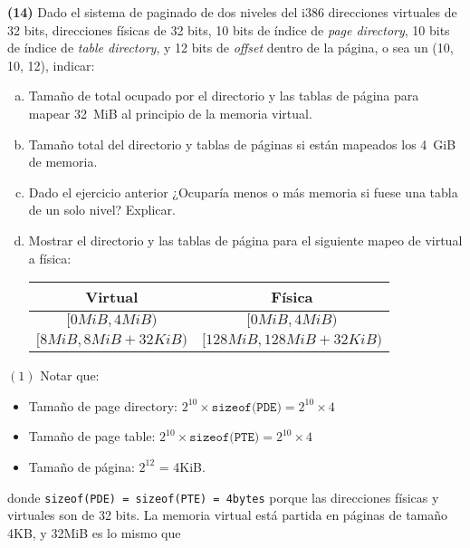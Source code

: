 \documentclass[12pt]{article}
\theoremstyle{definition}
\begin{document}
\begin{shaded}
\textbf{(14)} Dado el sistema de paginado de dos niveles del i386 direcciones
virtuales de 32 bits, direcciones físicas de 32 bits, 10 bits de índice de
\textit{page directory}, 10 bits de índice de \textit{table directory}, y 12
bits de \textit{offset} dentro de la página, o sea un (10, 10, 12), indicar:

\begin{enumerate}[(a)]
    \item Tamaño de total ocupado por el directorio y las tablas de página para mapear 32~MiB al principio de la memoria virtual.

    \item Tamaño total del directorio y tablas de páginas si están mapeados los 4~GiB de memoria.

    \item Dado el ejercicio anterior ¿Ocuparía menos o más memoria si fuese una tabla de un solo nivel? Explicar.

    \item Mostrar el directorio y las tablas de página para el siguiente mapeo de virtual a física:
    
    \begin{center}
    \begin{tabular}{|c|c|}
        \hline
        Virtual & Física \\
        \hline
        $[0MiB, 4MiB)$ & $[0MiB, 4MiB)$ \\
        \hline
        $[8MiB, 8MiB + 32KiB)$ & $[128MiB, 128MiB + 32KiB)$ \\
        \hline
    \end{tabular}
    \end{center}
\end{enumerate}
\end{shaded}


$(1)$ Notar que:

\begin{itemize}
    \item Tamaño de page directory: $2^{10} \times \texttt{sizeof(PDE)} = 2^{10}
        \times 4$
    \item Tamaño de page table: $2^{10} \times \texttt{sizeof(PTE)} = 2^{10}
        \times 4$
    \item Tamaño de página: $2^{12}$ = 4KiB.
\end{itemize}

donde \texttt{sizeof(PDE) = sizeof(PTE) = 4bytes} porque las direcciones físicas
y virtuales son de 32 bits. La memoria virtual está partida en páginas de tamaño
4KB, y 32MiB es lo mismo que 
\end{document}
